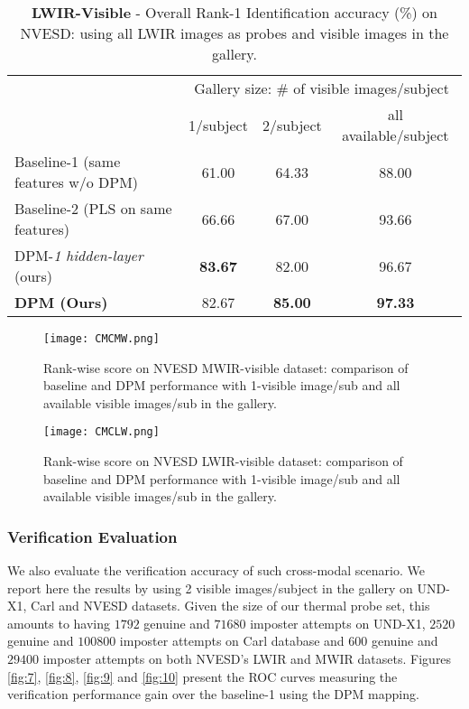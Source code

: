 \documentclass[smallextended,natbib]{svjour3}       \usepackage{graphicx}
\begin{document}
\begin{table}[t]
\centering
\begin{tabular}{@{}lccc@{}}
\toprule
                                 & \multicolumn{3}{c}{Gallery size: \# of visible images/subject} \\ \cmidrule(l){2-4} 
                                 & 1/subject         & 2/subject        & all available/subject   \\ \midrule
Baseline-1 (same features w/o DPM) & 61.00             & 64.33            & 88.00                   \\
Baseline-2 (PLS on same features) & 66.66             & 67.00            & 93.66                  \\
DPM-\textit{1 hidden-layer} (ours)             & \textbf{83.67}              & 82.00             & 96.67                   
\\
\textbf{DPM  (Ours)}             & 82.67    & \textbf{85.00}   & \textbf{97.33}          \\ \bottomrule
\end{tabular}
\caption{\textbf{LWIR-Visible} - Overall Rank-1 Identification accuracy (\%) on NVESD: using all LWIR images as probes and visible images in the gallery.}
\label{table:5}
\end{table}

\begin{figure}
  \begin{minipage}[t]{0.48\textwidth}  
    \texttt{[image: CMCMW.png]}
	\caption{Rank-wise score on NVESD MWIR-visible dataset: comparison of baseline and DPM performance with 1-visible image/sub and all available visible images/sub in the gallery.}
    \label{fig:5}
  \end{minipage}
  \hfill
  \begin{minipage}[t]{0.48\textwidth}
    \texttt{[image: CMCLW.png]}
\caption{Rank-wise score on NVESD LWIR-visible dataset: comparison of baseline and DPM performance with 1-visible image/sub and all available visible images/sub in the gallery.}    
  \label{fig:6}
  \end{minipage}
\end{figure}

\subsubsection{Verification Evaluation}
We also evaluate the verification accuracy of such cross-modal scenario. We report here the results by using 2 visible images/subject in the gallery on UND-X1, Carl and NVESD datasets. Given the size of our thermal probe set, this amounts to having $1792$ genuine and $71680$ imposter attempts on UND-X1, $2520$ genuine and $100800$ imposter attempts on Carl database and $600$ genuine and $29400$ imposter attempts on both NVESD's LWIR and MWIR datasets. Figures \ref{fig:7}, \ref{fig:8}, \ref{fig:9} and \ref{fig:10} present the ROC curves measuring the verification performance gain over the baseline-1 using the DPM mapping.
\end{document}
